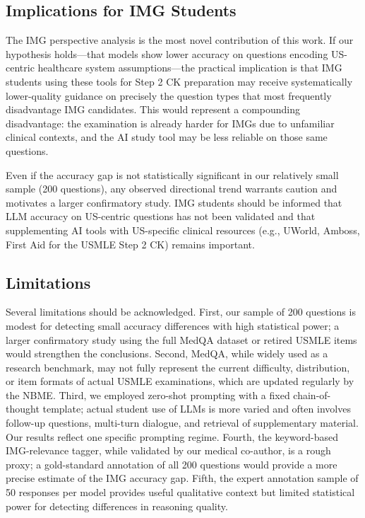 \subsection{Implications for IMG Students}

The IMG perspective analysis is the most novel contribution of this work. If our hypothesis holds—that models show lower accuracy on questions encoding US-centric healthcare system assumptions—the practical implication is that IMG students using these tools for Step 2 CK preparation may receive systematically lower-quality guidance on precisely the question types that most frequently disadvantage IMG candidates. This would represent a compounding disadvantage: the examination is already harder for IMGs due to unfamiliar clinical contexts, and the AI study tool may be less reliable on those same questions.

Even if the accuracy gap is not statistically significant in our relatively small sample (200 questions), any observed directional trend warrants caution and motivates a larger confirmatory study. IMG students should be informed that LLM accuracy on US-centric questions has not been validated and that supplementing AI tools with US-specific clinical resources (e.g., UWorld, Amboss, First Aid for the USMLE Step 2 CK) remains important.

\subsection{Limitations}

Several limitations should be acknowledged. First, our sample of 200 questions is modest for detecting small accuracy differences with high statistical power; a larger confirmatory study using the full MedQA dataset or retired USMLE items would strengthen the conclusions. Second, MedQA, while widely used as a research benchmark, may not fully represent the current difficulty, distribution, or item formats of actual USMLE examinations, which are updated regularly by the NBME. Third, we employed zero-shot prompting with a fixed chain-of-thought template; actual student use of LLMs is more varied and often involves follow-up questions, multi-turn dialogue, and retrieval of supplementary material. Our results reflect one specific prompting regime. Fourth, the keyword-based IMG-relevance tagger, while validated by our medical co-author, is a rough proxy; a gold-standard annotation of all 200 questions would provide a more precise estimate of the IMG accuracy gap. Fifth, the expert annotation sample of 50 responses per model provides useful qualitative context but limited statistical power for detecting differences in reasoning quality.

